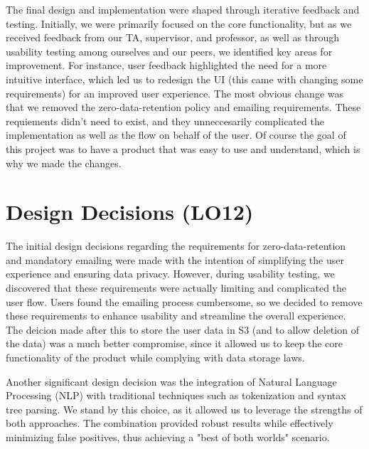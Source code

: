 \documentclass{article}
\begin{document}

The final design and implementation were shaped through iterative feedback and
testing. Initially, we were primarily focused on the core functionality, but as
we received feedback from our TA, supervisor, and professor, as well as through
usability testing among ourselves and our peers, we identified key areas for
improvement. For instance, user feedback highlighted the need for a more intuitive
interface, which led us to redesign the UI (this came with changing some requirements)
for an improved user experience. The most obvious change was that we removed the
zero-data-retention policy and emailing requirements. These requiements didn't
need to exist, and they unneccesarily complicated the implementation as well as
the flow on behalf of the user. Of course the goal of this project was to have
a product that was easy to use and understand, which is why we made the changes.

\section{Design Decisions (LO12)}

The initial design decisions regarding the requirements for zero-data-retention
and mandatory emailing were made with the intention of simplifying the user
experience and ensuring data privacy. However, during usability testing, we
discovered that these requirements were actually limiting and complicated the
user flow. Users found the emailing process cumbersome, so we decided to remove
these requirements to enhance usability and streamline the overall experience.
The deicion made after this to store the user data in S3 (and to allow deletion
of the data) was a much better compromise, since it allowed us to keep the
core functionality of the product while complying with data storage laws.

Another significant design decision was the integration of Natural Language
Processing (NLP) with traditional techniques such as tokenization and syntax tree
parsing. We stand by this choice, as it allowed us to leverage the strengths of
both approaches. The combination provided robust results while effectively
minimizing false positives, thus achieving a "best of both worlds" scenario.
\end{document}
